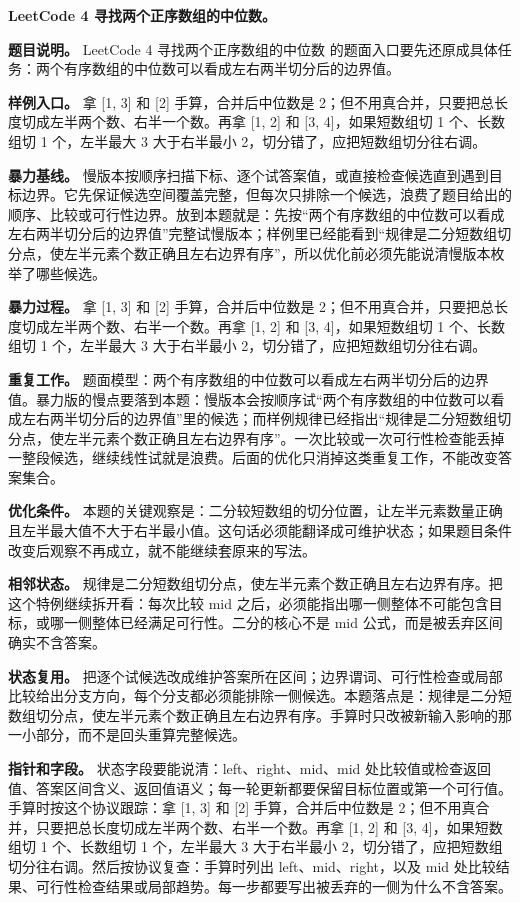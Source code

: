 
\noindent\textbf{LeetCode 4 寻找两个正序数组的中位数。}

\textbf{题目说明。} LeetCode 4 寻找两个正序数组的中位数 的题面入口要先还原成具体任务：两个有序数组的中位数可以看成左右两半切分后的边界值。

\textbf{样例入口。} 拿 [1, 3] 和 [2] 手算，合并后中位数是 2；但不用真合并，只要把总长度切成左半两个数、右半一个数。再拿 [1, 2] 和 [3, 4]，如果短数组切 1 个、长数组切 1 个，左半最大 3 大于右半最小 2，切分错了，应把短数组切分往右调。

\textbf{暴力基线。} 慢版本按顺序扫描下标、逐个试答案值，或直接检查候选直到遇到目标边界。它先保证候选空间覆盖完整，但每次只排除一个候选，浪费了题目给出的顺序、比较或可行性边界。放到本题就是：先按“两个有序数组的中位数可以看成左右两半切分后的边界值”完整试慢版本；样例里已经能看到“规律是二分短数组切分点，使左半元素个数正确且左右边界有序”，所以优化前必须先能说清慢版本枚举了哪些候选。

\textbf{暴力过程。} 拿 [1, 3] 和 [2] 手算，合并后中位数是 2；但不用真合并，只要把总长度切成左半两个数、右半一个数。再拿 [1, 2] 和 [3, 4]，如果短数组切 1 个、长数组切 1 个，左半最大 3 大于右半最小 2，切分错了，应把短数组切分往右调。

\textbf{重复工作。} 题面模型：两个有序数组的中位数可以看成左右两半切分后的边界值。暴力版的慢点要落到本题：慢版本会按顺序试“两个有序数组的中位数可以看成左右两半切分后的边界值”里的候选；而样例规律已经指出“规律是二分短数组切分点，使左半元素个数正确且左右边界有序”。一次比较或一次可行性检查能丢掉一整段候选，继续线性试就是浪费。后面的优化只消掉这类重复工作，不能改变答案集合。

\textbf{优化条件。} 本题的关键观察是：二分较短数组的切分位置，让左半元素数量正确且左半最大值不大于右半最小值。这句话必须能翻译成可维护状态；如果题目条件改变后观察不再成立，就不能继续套原来的写法。

\textbf{相邻状态。} 规律是二分短数组切分点，使左半元素个数正确且左右边界有序。把这个特例继续拆开看：每次比较 mid 之后，必须能指出哪一侧整体不可能包含目标，或哪一侧整体已经满足可行性。二分的核心不是 mid 公式，而是被丢弃区间确实不含答案。

\textbf{状态复用。} 把逐个试候选改成维护答案所在区间；边界谓词、可行性检查或局部比较给出分支方向，每个分支都必须能排除一侧候选。本题落点是：规律是二分短数组切分点，使左半元素个数正确且左右边界有序。手算时只改被新输入影响的那一小部分，而不是回头重算完整候选。

\textbf{指针和字段。} 状态字段要能说清：left、right、mid、mid 处比较值或检查返回值、答案区间含义、返回值语义；每一轮更新都要保留目标位置或第一个可行值。手算时按这个协议跟踪：拿 [1, 3] 和 [2] 手算，合并后中位数是 2；但不用真合并，只要把总长度切成左半两个数、右半一个数。再拿 [1, 2] 和 [3, 4]，如果短数组切 1 个、长数组切 1 个，左半最大 3 大于右半最小 2，切分错了，应把短数组切分往右调。然后按协议复查：手算时列出 left、mid、right，以及 mid 处比较结果、可行性检查结果或局部趋势。每一步都要写出被丢弃的一侧为什么不含答案。


